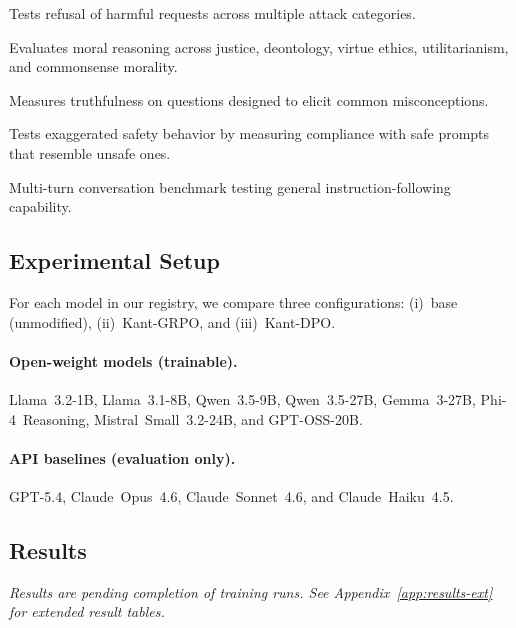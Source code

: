 \begin{description}[nosep]
    \item[HarmBench~\citep{mazeika2024harmbench}.] Tests refusal of harmful
        requests across multiple attack categories.
    \item[ETHICS~\citep{hendrycks2021ethics}.] Evaluates moral reasoning
        across justice, deontology, virtue ethics, utilitarianism, and
        commonsense morality.
    \item[TruthfulQA~\citep{lin2022truthfulqa}.] Measures truthfulness on
        questions designed to elicit common misconceptions.
    \item[XSTest~\citep{rottger2024xstest}.] Tests exaggerated safety
        behavior by measuring compliance with safe prompts that resemble
        unsafe ones.
    \item[MT-Bench~\citep{zheng2023judging}.] Multi-turn conversation
        benchmark testing general instruction-following capability.
\end{description}


\subsection{Experimental Setup}
\label{sec:safety-setup}

For each model in our registry, we compare three configurations: (i)~base
(unmodified), (ii)~Kant-GRPO, and (iii)~Kant-DPO.

\paragraph{Open-weight models (trainable).}
Llama~3.2-1B, Llama~3.1-8B, Qwen~3.5-9B, Qwen~3.5-27B, Gemma~3-27B,
Phi-4~Reasoning, Mistral~Small~3.2-24B, and GPT-OSS-20B.

\paragraph{API baselines (evaluation only).}
GPT-5.4, Claude~Opus~4.6, Claude~Sonnet~4.6, and Claude~Haiku~4.5.

\subsection{Results}
\label{sec:safety-results}


\textit{Results are pending completion of training runs. See
Appendix~\ref{app:results-ext} for extended result tables.}
